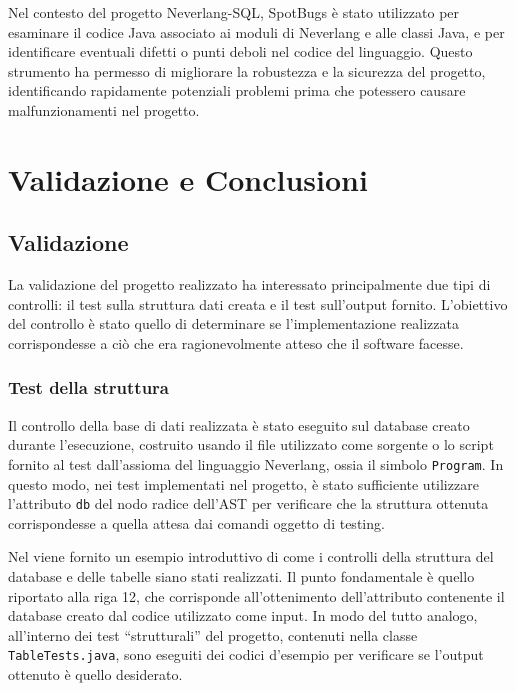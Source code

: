 \documentclass[12pt,a4paper,openright,twoside]{book}
\begin{document}
Nel contesto del progetto Neverlang-SQL, SpotBugs è stato utilizzato per esaminare il codice Java associato ai moduli di Neverlang e alle 
classi Java, e per identificare eventuali difetti o punti deboli nel codice del linguaggio. Questo strumento ha permesso di migliorare la 
robustezza e la sicurezza del progetto, identificando rapidamente potenziali problemi prima che potessero causare malfunzionamenti nel 
progetto.

\chapter{Validazione e Conclusioni}
\label{chap:conclusioni}
\section{Validazione}
\label{chap:validazione}
La validazione del progetto realizzato ha interessato principalmente due tipi di controlli: il test sulla struttura dati creata 
e il test sull’output fornito. L’obiettivo del controllo è stato quello di determinare se l’implementazione realizzata 
corrispondesse a ciò che era ragionevolmente atteso che il software facesse.

\subsection{Test della struttura}
\label{section:test-strutt}
Il controllo della base di dati realizzata è stato eseguito sul database creato durante l’esecuzione, costruito usando il file 
utilizzato come sorgente o lo script fornito al test dall’assioma del linguaggio Neverlang, ossia il simbolo \texttt{Program}. In 
questo modo, nei test implementati nel progetto, è stato sufficiente utilizzare l’attributo \texttt{db} del nodo radice dell’AST 
per verificare che la struttura ottenuta corrispondesse a quella attesa dai comandi oggetto di testing.

Nel  viene fornito un esempio introduttivo di come i controlli della struttura del database e delle tabelle 
siano stati realizzati. Il punto fondamentale è quello riportato alla riga 12, che corrisponde all’ottenimento dell’attributo 
contenente il database creato dal codice utilizzato come input. In modo del tutto analogo, all’interno dei test “strutturali” del 
progetto, contenuti nella classe \texttt{TableTests.java}, sono eseguiti dei codici d’esempio per verificare se l’output ottenuto 
è quello desiderato.
\end{document}
